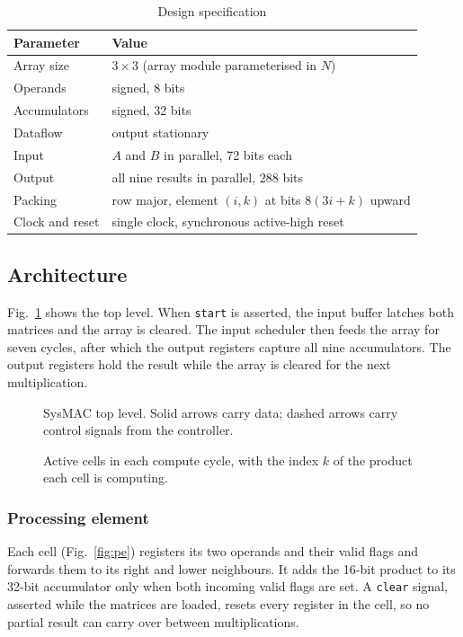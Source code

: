 \documentclass[conference]{IEEEtran}
\newcommand{\code}[1]{\texttt{#1}}
\begin{document}
\begin{table}[t]
\caption{Design specification}
\label{tab:spec}
\centering
\begin{tabular}{@{}ll@{}}
\toprule
Parameter & Value \\
\midrule
Array size & $3 \times 3$ (array module parameterised in $N$) \\
Operands & signed, 8 bits \\
Accumulators & signed, 32 bits \\
Dataflow & output stationary \\
Input & $A$ and $B$ in parallel, 72 bits each \\
Output & all nine results in parallel, 288 bits \\
Packing & row major, element $(i,k)$ at bits $8(3i+k)$ upward \\
Clock and reset & single clock, synchronous active-high reset \\
\bottomrule
\end{tabular}
\end{table}

\subsection{Architecture}
Fig.~\ref{fig:top} shows the top level. When \code{start} is asserted, the input buffer latches both matrices and the array is cleared. The input scheduler then feeds the array for seven cycles, after which the output registers capture all nine accumulators. The output registers hold the result while the array is cleared for the next multiplication.

\begin{figure}[t]
\centering
\resizebox{0.86\textwidth}{!}{}
\caption{SysMAC top level. Solid arrows carry data; dashed arrows carry control signals from the controller.}
\label{fig:top}
\end{figure}

\begin{figure}[t]
\centering
\resizebox{0.9\textwidth}{!}{}
\caption{Active cells in each compute cycle, with the index $k$ of the product each cell is computing.}
\label{fig:wave}
\end{figure}

\subsubsection{Processing element}
Each cell (Fig.~\ref{fig:pe}) registers its two operands and their valid flags and forwards them to its right and lower neighbours. It adds the 16-bit product to its 32-bit accumulator only when both incoming valid flags are set. A \code{clear} signal, asserted while the matrices are loaded, resets every register in the cell, so no partial result can carry over between multiplications.
\end{document}
